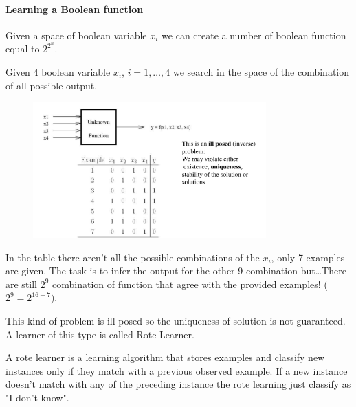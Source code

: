 \documentclass[../main.tex]{subfiles}
\begin{document}
\paragraph{Learning a Boolean function}%
Given a space of boolean variable $x_i$ we can create a number of boolean function equal to $2^{2^n}$. 
\begin{example}
  Given 4 boolean variable $x_i$, $i = 1,\ldots, 4$ we search in the space of the combination of all possible output.
  \begin{figure}[H]
      \centering
      \includegraphics[width=0.8\textwidth]{lectures/1_Introduction/learn_bool_func.png}
  \end{figure}
  In the table there aren't all the possible combinations of the $x_i$, only 7 examples are given. The task is to infer the output for the other 9 combination but\ldots There are still $2^9$ combination of function that agree with the provided examples! ($2^9 = 2^{16 - 7})$.
\end{example}
This kind of problem is ill posed so the uniqueness of solution is not guaranteed. A learner of this type is called Rote Learner.
\begin{definition}
    A rote learner is a learning algorithm that stores examples and classify new instances only if they match with a previous observed example.
    If a new instance doesn't match with any of the preceding instance the rote learning just classify as "I don't know".
\end{definition}
\end{document}
